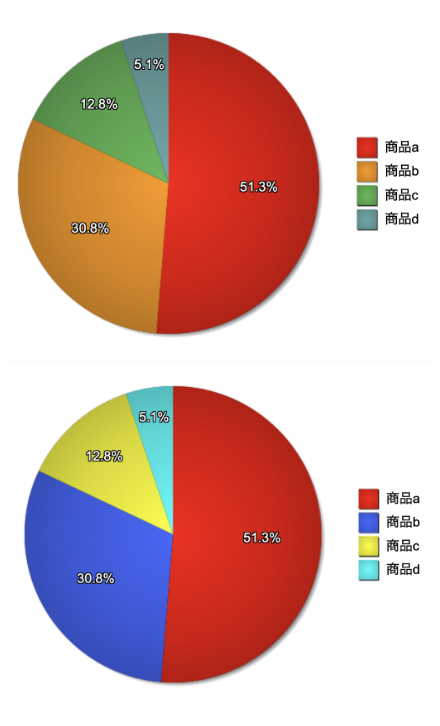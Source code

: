 \begin{figure}[H]
    \centering
    \begin{minipage}[b]{.49\textwidth}
        \centering
        \includegraphics[keepaspectratio,width=\textwidth]{../../10_UniversalDesign/no2_circle_original.png}
    \end{minipage}
    \begin{minipage}[b]{.49\textwidth}
        \centering
        \includegraphics[keepaspectratio,width=\textwidth]{../../10_UniversalDesign/no2_circle_reviced.png}

\end{minipage}
\end{figure}
